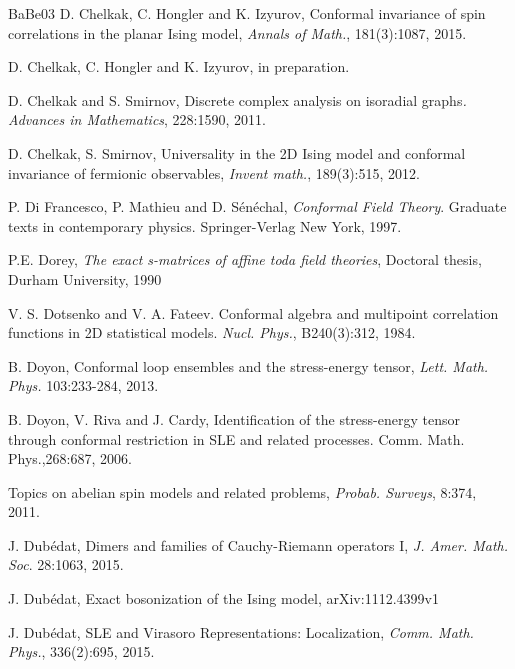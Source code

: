\documentclass[12pt,oneside,english]{amsart}
\numberwithin{equation}{section}
\numberwithin{figure}{section}
\theoremstyle{plain}
\theoremstyle{plain}
\theoremstyle{plain}
\theoremstyle{plain}
\theoremstyle{remark}
\theoremstyle{definition}
\theoremstyle{plain}
\theoremstyle{plain}
\numberwithin{thm}{section}
\begin{document}
\begin{thebibliography}{BaBe03}
D. Chelkak, C. Hongler and
K. Izyurov, Conformal invariance of spin correlations in the planar
Ising model, \emph{Annals of Math.}, 181(3):1087,
2015.

D. Chelkak, C. Hongler
and K. Izyurov, in preparation.

D. Chelkak and S. Smirnov, Discrete
complex analysis on isoradial graphs\emph{. Advances in Mathematics},
228:1590, 2011.

D. Chelkak, S. Smirnov, Universality
in the 2D Ising model and conformal invariance of fermionic observables,
\emph{Invent math.}, 189(3):515, 2012.

P. Di Francesco, P.
Mathieu and D. S\'en\'echal, \emph{Conformal Field Theory}. Graduate texts
in contemporary physics. Springer-Verlag New York, 1997.

P.E. Dorey, \emph{The exact s-matrices of affine
toda field theories}, Doctoral thesis, Durham University, 1990

V. S. Dotsenko and V. A. Fateev.
Conformal algebra and multipoint correlation functions in 2D statistical
models. \emph{Nucl. Phys.}, B240(3):312, 1984.

B. Doyon, Conformal loop ensembles and the
stress-energy tensor, \emph{Lett. Math. Phys.} 103:233-284, 2013.

B. Doyon, V. Riva and J. Cardy,
Identification of the stress-energy tensor through conformal restriction
in SLE and related processes. Comm. Math. Phys.,268:687,
2006.

Topics on abelian spin models and related
problems, \emph{Probab. Surveys}, 8:374, 2011.

J. Dub\'edat, Dimers and families of Cauchy-Riemann
operators I, \emph{J. Amer. Math. Soc}. 28:1063, 2015.

J. Dub\'edat, Exact bosonization of the
Ising model, arXiv:1112.4399v1

J. Dub\'edat, SLE and Virasoro Representations:
Localization, \emph{Comm. Math. Phys.}, 336(2):695,
2015.


\end{thebibliography}
\end{document}
